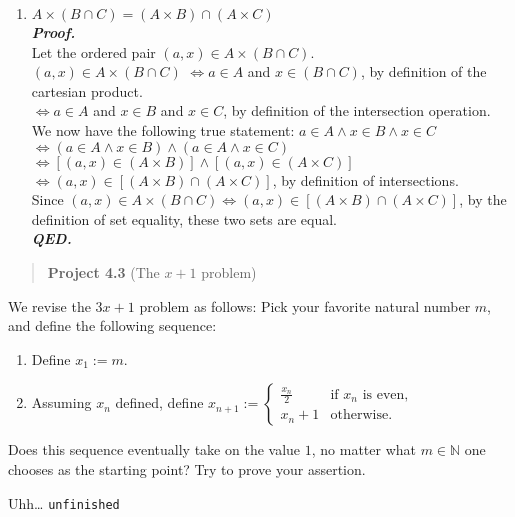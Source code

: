 \begin{enumerate}
\def\labelenumi{(\roman{enumi})}
\setcounter{enumi}{1}
\tightlist
\item
  \(A \times (B \cap C) = (A \times B) \cap (A \times C)\)\\
  \textbf{\emph{Proof.}}\\
  Let the ordered pair \((a, x)\in A\times (B\cap C)\).\\
  \((a, x)\in A\times (B\cap C)\) \(\iff a\in A\) and
  \(x\in (B\cap C)\), by definition of the cartesian product.\\
  \(\iff a\in A\) and \(x\in B\) and \(x\in C\), by definition of the
  intersection operation.\\
  We now have the following true statement:
  \(a\in A \land x\in B \land x\in C\)\\
  \(\iff (a\in A \land x\in B) \land (a\in A \land x\in C)\)\\
  \(\iff [(a, x) \in (A \times B)] \land [(a, x) \in (A \times C)]\)\\
  \(\iff (a, x)\in [(A\times B) \cap (A\times C)]\), by definition of
  intersections.\\
  Since
  \((a,x)\in A\times (B\cap C)\iff (a,x)\in [(A\times B) \cap (A\times C)]\),
  by the definition of set equality, these two sets are equal.\\
  \textbf{\emph{QED.}}
\end{enumerate}

\begin{quote}
\textbf{Project 4.3} (The \(x + 1\) problem)
\end{quote}

We revise the \(3x + 1\) problem as follows: Pick your favorite natural
number \(m\), and define the following sequence:

\begin{enumerate}
\def\labelenumi{(\roman{enumi})}
\item
  Define \(x_1 := m\).
\item
  Assuming \(x_n\) defined, define \(x_{n+1} :=
  \begin{cases}
  \frac{x_n}{2} & \text{if } x_n \text{ is even,} \\
  x_n + 1 & \text{otherwise.}
  \end{cases}\)
\end{enumerate}

Does this sequence eventually take on the value \(1\), no matter what
\(m \in \mathbb{N}\) one chooses as the starting point? Try to prove
your assertion.

Uhh\ldots{} \texttt{unfinished}
